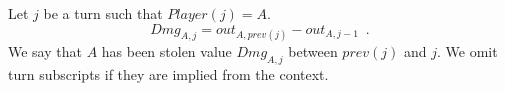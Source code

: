 {}
\begin{definition}[Damage]
  Let $j$ be a turn such that $Player\left(j\right) = A$.
  \begin{equation}
    Dmg_{A, j} = out_{A, prev\left(j\right)} - out_{A, j-1} \enspace.
  \end{equation}
  We say that $A$ has been stolen value $Dmg_{A, j}$ between $prev\left(j\right)$ and $j$. We omit turn subscripts
  if they are implied from the context.
\end{definition}
